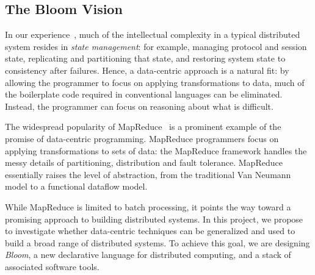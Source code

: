 \subsection{The Bloom Vision}
In our experience~\cite{boom-eurosys, netdb}, much of the intellectual
complexity in a typical distributed system resides in \emph{state
  management}: for example, managing protocol and session state, replicating and
  partitioning that state, and restoring system state to consistency after
  failures. Hence, a data-centric approach is a
natural fit: by allowing the programmer to focus on applying transformations to
data, much of the boilerplate code required in conventional languages can be
eliminated. Instead, the programmer can focus on reasoning about what is
difficult.

The widespread popularity of MapReduce~\cite{mapreduce-osdi} is a prominent
example of the promise of data-centric programming. MapReduce programmers focus
on applying transformations to sets of data: the MapReduce framework handles the
messy details of partitioning, distribution and fault tolerance. MapReduce
essentially raises the level of abstraction, from the traditional Van Neumann
model to a functional dataflow model.

While MapReduce is limited to batch processing, it points the way toward a
promising approach to building distributed systems. In this project, we propose
to investigate whether data-centric techniques can be generalized and used to
build a broad range of distributed systems. To achieve this goal, we are
designing \emph{Bloom}, a new declarative language for distributed computing,
and a stack of associated software tools.
